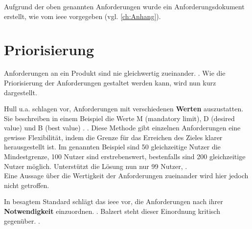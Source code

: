 Aufgrund der oben genannten Anforderungen wurde ein Anforderungsdokument erstellt, wie vom \ac{ieee} vorgegeben (vgl. \autoref{ch:Anhang}). 

\section{Priorisierung}

Anforderungen an ein Produkt sind nie gleichwertig zueinander. 
 \citep[][83]{Hull2010}. Wie die Priorisierung der Anforderungen gestaltet werden kann, wird nun kurz dargestellt.

Hull u.a. schlagen vor, Anforderungen mit verschiedenen \textbf{Werten} auszustatten. Sie beschreiben in einem Beispiel die Werte M (mandatory limit), D (desired value) und B (best value) \citep[vgl.][83]{Hull2010}.  \citep[][83]{Hull2010}.
Diese Methode gibt einzelnen Anforderungen eine gewisse Flexibilität, indem die Grenze für das Erreichen des Zieles klarer herausgestellt ist. Im genannten Beispiel sind 50 gleichzeitige Nutzer die Mindestgrenze, 100 Nutzer sind erstrebenswert, bestenfalls sind 200 gleichzeitige Nutzer möglich. Unterstützt die Lösung nun nur 99 Nutzer,  \citep[][83]{Hull2010}.\\
Eine Aussage über die Wertigkeit der Anforderungen zueinander wird hier jedoch nicht getroffen. 

In besagtem Standard schlägt das \ac{ieee} vor, die Anforderungen nach ihrer \textbf{Notwendigkeit} einzuordnen.  \citep[][7]{ieee1998}. Balzert steht dieser Einordnung kritisch gegenüber.  \citep[][543]{Balzert2010}.

